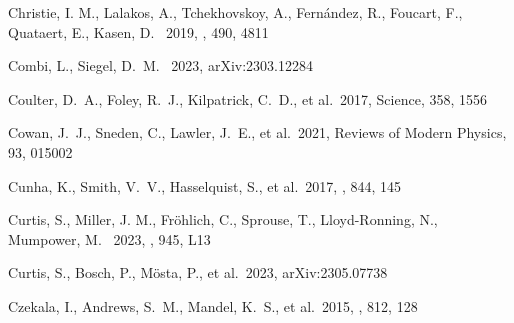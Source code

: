 \documentclass[twocolumn,twocolappendix]{aastex63}
\begin{document}
{\begin{thebibliography}{}
 Christie, I. M., Lalakos, A., Tchekhovskoy, A., Fern\'andez, R., Foucart, F., Quataert, E., Kasen, D. \ 2019, \mnras, 490, 4811






 Combi, L., Siegel, D.~M. \ 2023, arXiv:2303.12284







 Coulter, D.~A., Foley, R.~J., Kilpatrick, C.~D., et al.\ 2017, Science, 358, 1556




 Cowan, J.~J., Sneden, C., Lawler, J.~E., et al.\ 2021, Reviews of Modern Physics, 93, 015002


 Cunha, K., Smith, V.~V., Hasselquist, S., et al.\ 2017, \apj, 844, 145


 Curtis, S., Miller, J. M., Fr\"ohlich, C., 
Sprouse, T., Lloyd-Ronning, N., Mumpower, M. \ 2023, \apjl, 945, L13


 Curtis, S., Bosch, P., M{\"o}sta, P., et al.\ 2023, arXiv:2305.07738


 Czekala, I., Andrews, S.~M., Mandel, K.~S., et al.\ 2015, \apj, 812, 128



\end{thebibliography}}
\end{document}
